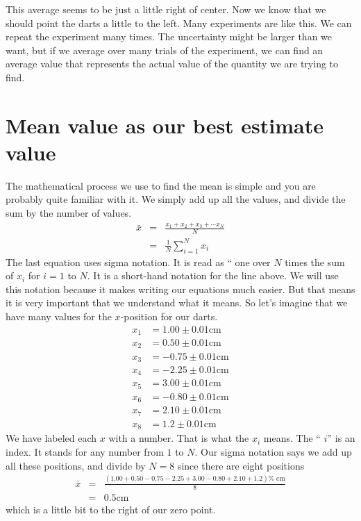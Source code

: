 \documentclass[twoside,11pt,ShortChapTitles]{BYUTextbook}
\begin{document}
This average seems to be just a little right of center. Now we know that we should point the darts a little
to the left. Many experiments are like this. We can repeat the experiment
many times. The uncertainty might be larger than we want, but if we average
over many trials of the experiment, we can find an average value that
represents the actual value of the quantity we are trying to find.

\section{Mean value as our best estimate value}

The mathematical process we use to find the mean is simple and you are
probably quite familiar with it. We simply add up all the values, and divide
the sum by the number of values.%
\begin{eqnarray*}
\bar{x} &=&\frac{x_{1}+x_{2}+x_{3}+\cdots x_{N}}{N} \\
&=&\frac{1}{N}\sum_{i=1}^{N}x_{i}
\end{eqnarray*}%
The last equation uses sigma notation. It is read as `` one
over $N$ times the sum of $x_{i}$ for $i=1$ to $N.$ It is a short-hand
notation for the line above. We will use this notation because it makes
writing our equations much easier. But that means it is very important that
we understand what it means. So let's imagine that we have many values for
the $x$-position for our darts.%
\[
\begin{aligned}
x_{1}&=1.00\pm 0.01\text{cm} \\
x_{2}&=0.50\pm 0.01\text{cm} \\
x_{3}&=-0.75\pm 0.01\text{cm} \\
x_{4}&=-2.25\pm 0.01\text{cm} \\
x_{5}&=3.00\pm 0.01\text{cm} \\
x_{6}&=-0.80\pm 0.01\text{cm} \\
x_{7}&=2.10\pm 0.01\text{cm} \\
x_{8}&=1.2\pm 0.01\text{cm}%
\end{aligned}%
\]%
We have labeled each $x$ with a number. That is what the $x_{i}$ means. The
`` $i$'' is an index. It stands for any
number from $1$ to $N.$ Our sigma notation says we add up all these
positions, and divide by $N=8$ since there are eight positions%
\begin{eqnarray*}
\bar{x} &=&\frac{\left( 1.00+0.50-0.75-2.25+3.00-0.80+2.10+1.2\right) \text{%
cm}}{8} \\
&=&0.5\text{cm}
\end{eqnarray*}%
which is a little bit to the right of our zero point.
\end{document}
